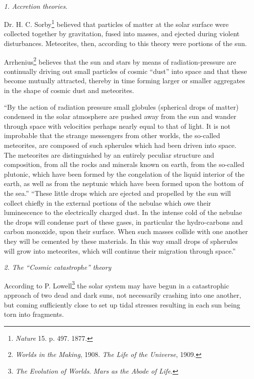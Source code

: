 \documentclass[a4paper, 12pt, oneside, landscape]{article}
\begin{document}
\paragraph{}
\centerline{\emph{1. Accretion theories}.}
Dr. H. C. Sorby\footnote{\emph{Nature} 15. p. 497. 1877.} believed that particles of matter at the solar surface were collected together by gravitation, fused into masses, and ejected during violent disturbances. Meteorites, then, according to this theory were portions of the sun.

Arrhenius\footnote{\emph{Worlds in the Making}, 1908. \emph{The Life of the Universe}, 1909.} believes that the sun and stars by means of radiation-pressure are continually driving out small particles of cosmic ``dust'' into space and that these become mutually attracted, thereby in time forming larger or smaller aggregates in the shape of cosmic dust and meteorites.

``By the action of radiation pressure small globules (spherical drops of matter) condensed in the solar atmosphere are pushed away from the sun and wander through space with velocities perhaps nearly equal to that of light. It is not improbable that the strange messengers from other worlds, the so-called meteorites, are composed of such spherules which had been driven into space. The meteorites are distinguished by an entirely peculiar structure and composition, from all the rocks and minerals known on earth, from the so-called plutonic, which have been formed by the congelation of the liquid interior of the earth, as well as from the neptunic which have been formed upon the bottom of the sea.'' ``These little drops which are ejected and propelled by the sun will collect chiefly in the external portions of the nebulae which owe their luminescence to the electrically charged dust. In the intense cold of the nebulae the drops will condense part of these gases, in particular the hydro-carbons and carbon monoxide, upon their surface. When such masses collide with one another they will be cemented by these materials. In this way small drops of spherules will grow into meteorites, which will continue their migration through space.''

\bigskip
\centerline{\emph{2. The ``Cosmic catastrophe'' theory}}

According to P. Lowell\footnote{\emph{The Evolution of Worlds}. \emph{Mars as the Abode of Life}.} the solar system may have begun in a catastrophic approach of two dead and dark suns, not necessarily crashing into one another, but coming sufficiently close to set up tidal stresses resulting in each sun being torn into fragments.
\end{document}
